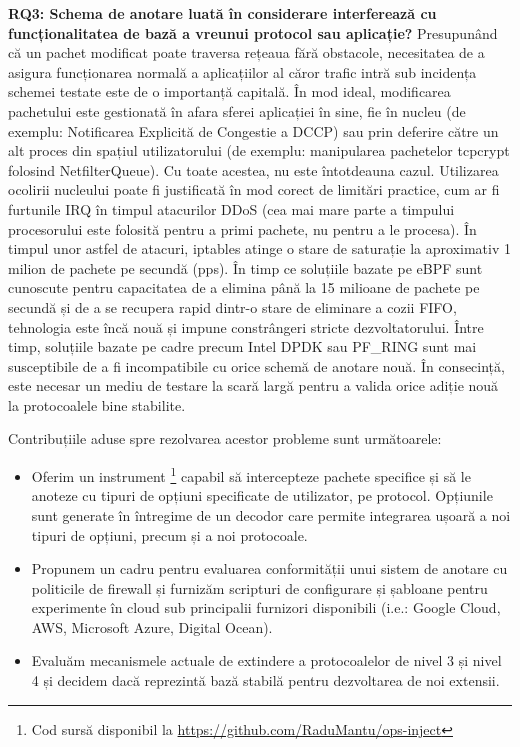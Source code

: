 \textbf{RQ3: Schema de anotare luată în considerare interferează cu funcționalitatea de bază a vreunui protocol sau aplicație?}
Presupunând că un pachet modificat poate traversa rețeaua fără obstacole, necesitatea de a asigura funcționarea normală a aplicațiilor al căror trafic intră sub incidența schemei testate este de o importanță capitală. În mod ideal, modificarea pachetului este gestionată în afara sferei aplicației în sine, fie în nucleu (de exemplu: Notificarea Explicită de Congestie a DCCP) sau prin deferire către un alt proces din spațiul utilizatorului (de exemplu: manipularea pachetelor tcpcrypt folosind NetfilterQueue). Cu toate acestea, nu este întotdeauna cazul. Utilizarea ocolirii nucleului poate fi justificată în mod corect de limitări practice, cum ar fi furtunile IRQ în timpul atacurilor DDoS (cea mai mare parte a timpului procesorului este folosită pentru a primi pachete, nu pentru a le procesa). În timpul unor astfel de atacuri, iptables atinge o stare de saturație la aproximativ 1 milion de pachete pe secundă (pps). În timp ce soluțiile bazate pe eBPF sunt cunoscute pentru capacitatea de a elimina până la 15 milioane de pachete pe secundă și de a se recupera rapid dintr-o stare de eliminare a cozii FIFO, tehnologia este încă nouă și impune constrângeri stricte dezvoltatorului. Între timp, soluțiile bazate pe cadre precum Intel DPDK sau PF_RING sunt mai susceptibile de a fi incompatibile cu orice schemă de anotare nouă. În consecință, este necesar un mediu de testare la scară largă pentru a valida orice adiție nouă la protocoalele bine stabilite.

Contribuțiile aduse spre rezolvarea acestor probleme sunt următoarele:
\begin{itemize}
    \item Oferim un instrument \footnote{Cod sursă disponibil la \url{https://github.com/RaduMantu/ops-inject}} capabil să intercepteze pachete specifice și să le anoteze cu tipuri de opțiuni specificate de utilizator, pe protocol. Opțiunile sunt generate în întregime de un decodor care permite integrarea ușoară a noi tipuri de opțiuni, precum și a noi protocoale.
    \item Propunem un cadru pentru evaluarea conformității unui sistem de anotare cu politicile de firewall și furnizăm scripturi de configurare și șabloane pentru experimente în cloud sub principalii furnizori disponibili (i.e.: Google Cloud, AWS, Microsoft Azure, Digital Ocean).
    \item Evaluăm mecanismele actuale de extindere a protocoalelor de nivel 3 și nivel 4 și decidem dacă reprezintă bază stabilă pentru dezvoltarea de noi extensii.
\end{itemize}

